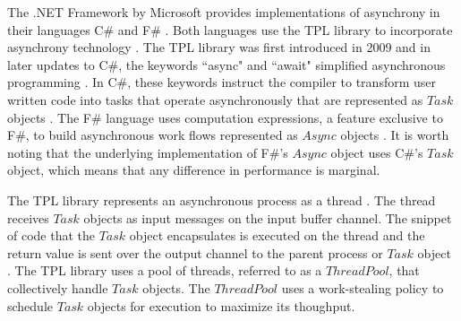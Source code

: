 The .NET Framework by Microsoft provides implementations of asynchrony in their languages C\# and F\# \cite{Leijen2009}\cite{syme2011f}. Both languages use the TPL library to incorporate asynchrony technology \cite{Leijen2009}\cite{msftVFS}. The TPL library was first introduced in 2009 and in later updates to C\#, the keywords ``async" and ``await" simplified asynchronous programming \cite{alexdavies2012}. In C\#, these keywords instruct the compiler to transform user written code into tasks that operate asynchronously that are represented as $Task$ objects \cite{Leijen2009}. The F\# language uses computation expressions, a feature exclusive to F\#, to build asynchronous work flows represented as $Async$ objects \cite{syme2011f}. It is worth noting that the underlying implementation of F\#'s $Async$ object uses C\#'s $Task$ object, which means that any difference in performance is marginal.

The TPL library represents an asynchronous process as a thread \cite{Leijen2009}. The thread receives $Task$ objects as input messages on the input buffer channel. The snippet of code that the $Task$ object encapsulates is executed on the thread and the return value is sent over the output channel to the parent process or $Task$ object \cite{Leijen2009}. The TPL library uses a pool of threads, referred to as a $ThreadPool$, that collectively handle $Task$ objects. The $ThreadPool$ uses a work-stealing policy to schedule $Task$ objects for execution to maximize its thoughput.
